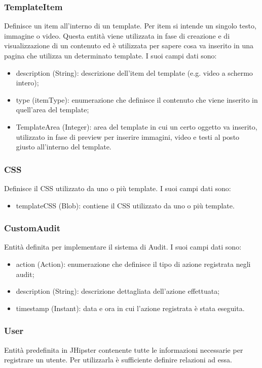 \subsubsection{TemplateItem}
Definisce un item all'interno di un template. Per item si intende un singolo testo, immagine o video. Questa entità viene utilizzata in fase di creazione e di visualizzazione di un contenuto ed è utilizzata per sapere cosa va inserito in una pagina che utilizza un determinato template. 
I suoi campi dati sono:
\begin{itemize}
    \item description (String): descrizione dell'item del template (e.g. video a schermo intero);
    \item type (itemType): enumerazione che definisce il contenuto che viene inserito in quell’area del template;
    \item TemplateArea (Integer): area del template in cui un certo oggetto va inserito, utilizzato in fase di preview per inserire immagini, video e testi al posto giusto all'interno del template.
\end{itemize}

\subsubsection{CSS}
Definisce il CSS utilizzato da uno o più template. I suoi campi dati sono:
\begin{itemize}
    \item templateCSS (Blob): contiene il CSS utilizzato da uno o più template.
\end{itemize}

\subsubsection{CustomAudit}
Entità definita per implementare il sistema di Audit. I suoi campi dati sono:
\begin{itemize}
    \item action (Action): enumerazione che definisce il tipo di azione registrata negli audit;
    \item description (String): descrizione dettagliata dell'azione effettuata;
    \item timestamp (Instant): data e ora in cui l'azione registrata è stata eseguita.
\end{itemize}

\subsubsection{User}
Entità predefinita in JHipster contenente tutte le informazioni necessarie per registrare un utente. Per utilizzarla è sufficiente definire relazioni ad essa.

